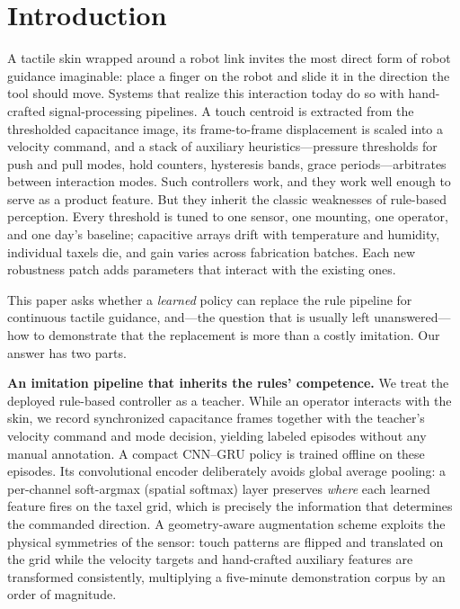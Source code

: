 \documentclass[runningheads]{llncs}
\begin{document}
\section{Introduction}
\label{sec:intro}

A tactile skin wrapped around a robot link invites the most direct form of
robot guidance imaginable: place a finger on the robot and slide it in the
direction the tool should move.  Systems that realize this interaction
today do so with hand-crafted signal-processing pipelines.  A touch
centroid is extracted from the thresholded capacitance image, its
frame-to-frame displacement is scaled into a velocity command, and a stack
of auxiliary heuristics---pressure thresholds for push and pull modes,
hold counters, hysteresis bands, grace periods---arbitrates between
interaction modes.  Such controllers work, and they work well enough to
serve as a product feature.  But they inherit the classic weaknesses of
rule-based perception.  Every threshold is tuned to one sensor, one
mounting, one operator, and one day's baseline; capacitive arrays drift
with temperature and humidity, individual taxels die, and gain varies
across fabrication batches.  Each new robustness patch adds parameters
that interact with the existing ones.

This paper asks whether a \emph{learned} policy can replace the rule
pipeline for continuous tactile guidance, and---the question that is
usually left unanswered---how to demonstrate that the replacement is more
than a costly imitation.  Our answer has two parts.

\textbf{An imitation pipeline that inherits the rules' competence.}
We treat the deployed rule-based controller as a teacher.  While an
operator interacts with the skin, we record synchronized capacitance
frames together with the teacher's velocity command and mode decision,
yielding labeled episodes without any manual annotation.  A compact
CNN--GRU policy is trained offline on these episodes.  Its convolutional
encoder deliberately avoids global average pooling: a per-channel
soft-argmax (spatial softmax) layer preserves \emph{where} each learned
feature fires on the taxel grid, which is precisely the information that
determines the commanded direction.  A geometry-aware augmentation scheme
exploits the physical symmetries of the sensor: touch patterns are flipped
and translated on the grid while the velocity targets and hand-crafted
auxiliary features are transformed consistently, multiplying a
five-minute demonstration corpus by an order of magnitude.
\end{document}
